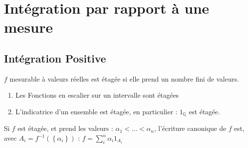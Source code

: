 \documentclass{cours}
\begin{document}
    \section{Intégration par rapport à une mesure}
    \subsection{Intégration Positive}
    \begin{definition}
        $f$ mesurable à valeurs réelles est étagée si elle prend un nombre fini de valeurs. 
    \end{definition}
    \begin{remark}
        \begin{enumerate}
            \item Les Fonctions en escalier sur un intervalle sont étagées
            \item L'indicatrice d'un ensemble est étagée, en particulier : $1_{\mathbb{Q}}$ est étagée.
        \end{enumerate}
    \end{remark}
    \begin{definition}
        Si $f$ est étagée, et prend les valeurs : $\alpha_{1} < \ldots < \alpha_{n}$, l'écriture canonique de $f$ est, avec $A_{i} = f^{-1}(\left\{\alpha_{i}\right\})$ : 
        $f =  \sum\limits_{i}^{n} \alpha_{i}1_{A_{i}}$
    \end{definition}
\end{document}
